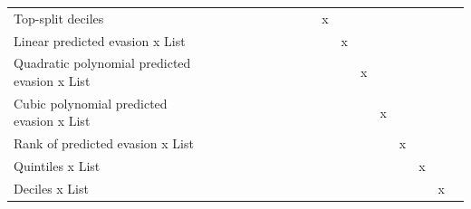 \begin{tabular}{lcccccccccccccccc}
Top-split deciles&                     &                     &                     &                     &                     &                     &                     &                     &           x         &                     &                     &                     &                     &                     &                     &                     \\
Linear predicted evasion x List&                     &                     &                     &                     &                     &                     &                     &                     &                     &           x         &                     &                     &                     &                     &                     &                     \\
Quadratic polynomial predicted evasion x List&                     &                     &                     &                     &                     &                     &                     &                     &                     &                     &           x         &                     &                     &                     &                     &                     \\
Cubic polynomial predicted evasion x List&                     &                     &                     &                     &                     &                     &                     &                     &                     &                     &                     &           x         &                     &                     &                     &                     \\
Rank of predicted evasion x List&                     &                     &                     &                     &                     &                     &                     &                     &                     &                     &                     &                     &           x         &                     &                     &                     \\
Quintiles x List&                     &                     &                     &                     &                     &                     &                     &                     &                     &                     &                     &                     &                     &           x         &                     &                     \\
Deciles x List&                     &                     &                     &                     &                     &                     &                     &                     &                     &                     &                     &                     &                     &                     &           x         &                     \\

\end{tabular}
